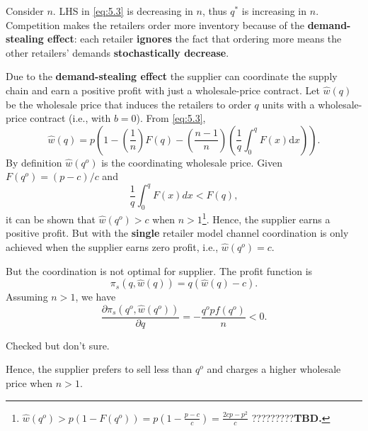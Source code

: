 Consider $n$. LHS in \autoref{eq:5.3} is decreasing in $n$, thus $q^*$ is increasing in $n$. Competition makes the retailers order more inventory because of the \textbf{demand-stealing effect}: each retailer \textbf{ignores} the fact that ordering more means the other retailers' demands \textbf{stochastically decrease}.

Due to the \textbf{demand-stealing effect} the supplier can coordinate the supply chain and earn a positive profit with just a wholesale-price contract.
Let $\hat{w}(q)$ be the wholesale price that induces the retailers to order $q$ units with a wholesale-price contract (i.e., with $b=0$). From \autoref{eq:5.3},
\begin{equation*}
    \hat{w}(q)=p\left(1-\left(\frac{1}{n}\right) F(q)-\left(\frac{n-1}{n}\right)\left(\frac{1}{q} \int_{0}^{q} F(x) \mathrm{d} x\right)\right).
\end{equation*}
By definition $\hat{w}(q^o)$ is the coordinating wholesale price. Given $F(q^o)=(p-c)/c$ and 
\begin{equation*}
    \frac{1}{q}\int_0^q F(x)dx<F(q),
\end{equation*}
it can be shown that $\hat{w}(q^o)>c$ when $n>1$\footnote{
    $\hat{w}(q^o)>p\left(1-F(q^o)\right)=p(1-\frac{p-c}{c})=\frac{2cp-p^2}{c}$ ?????????\textbf{TBD.}
}. Hence, the supplier earns a positive profit. But with the \textbf{single} retailer model channel coordination is only achieved when the supplier earns zero profit, i.e., $\hat{w}(q^o)=c$. 

But the coordination is not optimal for supplier. The profit function is
\begin{equation*}
    \pi_s(q,\hat{w}(q))=q(\hat{w}(q)-c).
\end{equation*}
Assuming $n>1$, we have 
\begin{equation*}
    \frac{\partial\pi_s(q^o,\hat{w}(q^o))}{\partial q}=-\frac{q^o p f(q^o)}{n}<0.
\end{equation*}
\begin{note}
    Checked but don't sure.
\end{note}
Hence, the supplier prefers to sell less than $q^o$ and charges a higher wholesale price when $n>1$. 

